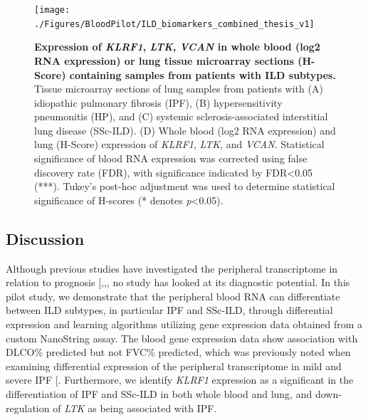 \documentclass[
]{article}
\begin{document}
\begin{figure}

{\centering \texttt{[image: ./Figures/BloodPilot/ILD\_biomarkers\_combined\_thesis\_v1]} 

}

\caption[Blood and Lung expression of LTK, KLRF1, VCAN]{\textbf{Expression of \textit{KLRF1}, \textit{LTK}, \textit{VCAN} in whole blood (log2 RNA expression) or lung tissue microarray sections (H-Score) containing samples from patients with ILD subtypes.} Tissue microarray sections of lung samples from patients with (A) idiopathic pulmonary fibrosis (IPF), (B) hypersensitivity pneumonitis (HP), and (C) systemic sclerosis-associated interstitial lung disease (SSc-ILD). (D) Whole blood (log2 RNA expression) and lung (H-Score) expression of \textit{KLRF1}, \textit{LTK}, and \textit{VCAN}. Statistical significance of blood RNA expression was corrected using false discovery rate (FDR), with significance indicated by FDR\textless0.05 (***). Tukey's post-hoc adjustment was used to determine statistical significance of H-scores (* denotes \textit{p}\textless0.05).}\label{fig:pilotexpr}
\end{figure}

\subsection{Discussion}\label{discussion-1}

Although previous studies have investigated the peripheral transcriptome in relation to prognosis {[},,\citeproc{ref-fernandez_perez_prognostic_2022}{102}{]}, no study has looked at its diagnostic potential. In this pilot study, we demonstrate that the peripheral blood RNA can differentiate between ILD subtypes, in particular IPF and SSc-ILD, through differential expression and learning algorithms utilizing gene expression data obtained from a custom NanoString assay. The blood gene expression data show association with DLCO\% predicted but not FVC\% predicted, which was previously noted when examining differential expression of the peripheral transcriptome in mild and severe IPF {[}\citeproc{ref-yang_peripheral_2012}{54}{]}. Furthermore, we identify \textit{KLRF1} expression as a significant in the differentiation of IPF and SSc-ILD in both whole blood and lung, and down-regulation of \textit{LTK} as being associated with IPF.
\end{document}
